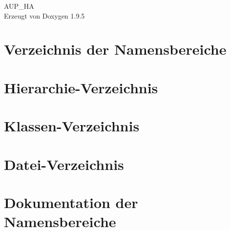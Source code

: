 \documentclass[twoside]{book}
\newcommand{\+}{\discretionary{\mbox{\scriptsize$\hookleftarrow$}}{}{}}
\newcommand{\clearemptydoublepage}{%
    \newpage{\pagestyle{empty}\cleardoublepage}%
  }
\begin{document}
  \raggedbottom
    \hypersetup{pageanchor=false,
                bookmarksnumbered=true,
                pdfencoding=unicode
               }
  \begin{titlepage}
  \vspace*{7cm}
  \begin{center}%
  {\Large AUP\+\_\+\+HA}\\
  \vspace*{1cm}
  {\large Erzeugt von Doxygen 1.9.5}\\
  \end{center}
  \end{titlepage}
  \clearemptydoublepage
  \tableofcontents
  \clearemptydoublepage
  \hypersetup{pageanchor=true}
\chapter{Verzeichnis der Namensbereiche}

\chapter{Hierarchie-\/\+Verzeichnis}

\chapter{Klassen-\/\+Verzeichnis}

\chapter{Datei-\/\+Verzeichnis}

\chapter{Dokumentation der Namensbereiche}






\end{document}

